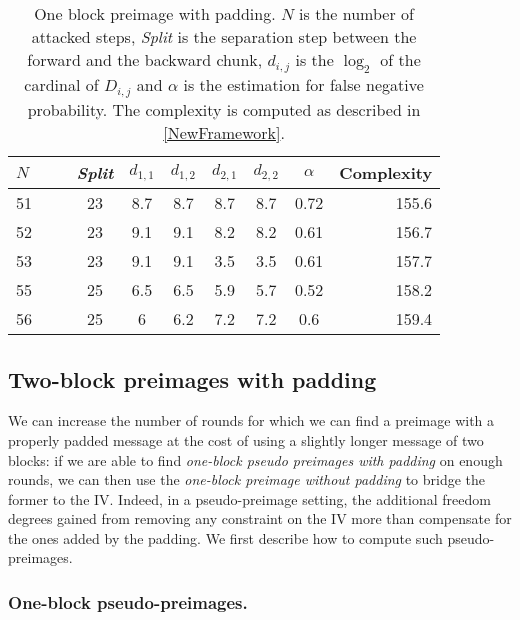  \begin{table}[t]
    \caption[One block preimage with padding.]{One block preimage with padding. $N$ is the 
              number of attacked steps, \emph{Split} is the separation step between the
              forward and the backward chunk, $d_{i,j}$ is the $\log_2$ of the cardinal
              of $D_{i,j}$ and $\alpha$ is the estimation for false negative probability. The complexity
              is computed as described in \autoref{NewFramework}.\label{SHA12}}
    \begin{center}
      \begin{tabular}{l c c c c c c r @{}} \toprule
        $N\qquad$ &  \emph{Split} & $d_{1,1}$ &  $d_{1,2}$ & $d_{2,1}$ & $d_{2,2}$ & $\alpha $ & Complexity \\\midrule
      51    & 23  & 8.7  & 8.7 & 8.7 & 8.7  & 0.72  & 155.6\\ 
      52    & 23  & 9.1  & 9.1 & 8.2 & 8.2  & 0.61  & 156.7\\ 
      53    & 23  & 9.1  & 9.1 & 3.5 & 3.5  & 0.61  & 157.7\\ 
      55    & 25  & 6.5  & 6.5 & 5.9 & 5.7  & 0.52  & 158.2\\ 
      56    & 25  & 6  & 6.2 & 7.2 & 7.2  & 0.6  & 159.4\\ 
        \bottomrule
        \hline
      \end{tabular}
    \end{center}
  \end{table}



  \subsection{Two-block preimages with padding}
\label{sec:one_two}


  We can increase the number of rounds for which we can find a preimage with a properly padded
  message at the cost of using a slightly longer message of two blocks: if we are able to find
  \emph{one-block pseudo preimages with padding} on enough rounds, we can then use the
  \emph{one-block preimage without padding} to bridge the former to the IV. Indeed,
  in a pseudo-preimage
  setting, the additional freedom degrees gained from removing any constraint on the IV
  more than compensate for the ones added by the padding. We first describe
  how to compute such pseudo-preimages.

  \subsubsection{One-block pseudo-preimages.}

